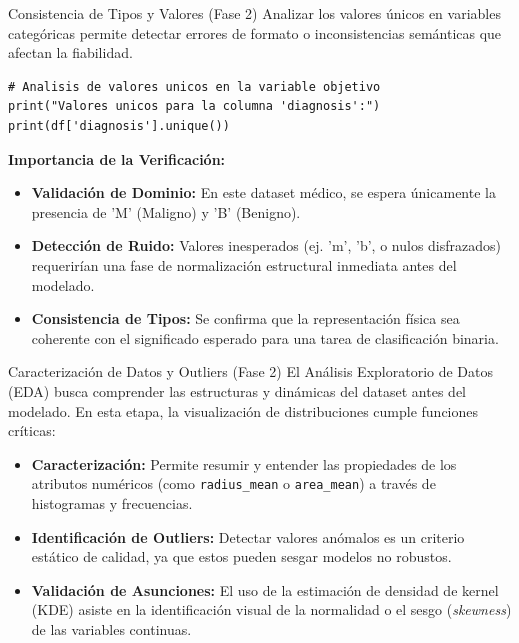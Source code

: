 \documentclass{beamer}
\begin{document}
	\begin{frame}[fragile]{Consistencia de Tipos y Valores (Fase 2)}
		Analizar los valores únicos en variables categóricas permite detectar errores de formato o inconsistencias semánticas que afectan la fiabilidad.
		
		\begin{lstlisting}[style=colab]
# Analisis de valores unicos en la variable objetivo
print("Valores unicos para la columna 'diagnosis':")
print(df['diagnosis'].unique())
		\end{lstlisting}
		
		\textbf{Importancia de la Verificación:}
		\begin{itemize}
			\item<2-> \textbf{Validación de Dominio:} En este dataset médico, se espera únicamente la presencia de 'M' (Maligno) y 'B' (Benigno).
			\item<3-> \textbf{Detección de Ruido:} Valores inesperados (ej. 'm', 'b', o nulos disfrazados) requerirían una fase de normalización estructural inmediata antes del modelado.
			\item<4-> \textbf{Consistencia de Tipos:} Se confirma que la representación física sea coherente con el significado esperado para una tarea de clasificación binaria.
		\end{itemize}
	\end{frame}
	
	\begin{frame}{Caracterización de Datos y Outliers (Fase 2)}
		El Análisis Exploratorio de Datos (EDA) busca comprender las estructuras y dinámicas del dataset antes del modelado. En esta etapa, la visualización de distribuciones cumple funciones críticas:
		
		\begin{itemize}
			\item<2-> \textbf{Caracterización:} Permite resumir y entender las propiedades de los atributos numéricos (como \texttt{radius\_mean} o \texttt{area\_mean}) a través de histogramas y frecuencias.
			\item<3-> \textbf{Identificación de Outliers:} Detectar valores anómalos es un criterio estático de calidad, ya que estos pueden sesgar modelos no robustos.
			\item<4-> \textbf{Validación de Asunciones:} El uso de la estimación de densidad de kernel (KDE) asiste en la identificación visual de la normalidad o el sesgo (\textit{skewness}) de las variables continuas.
		\end{itemize}
	\end{frame}
	
\end{document}
